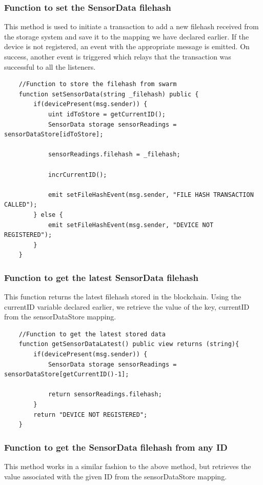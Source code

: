 \documentclass[11pt,openright]{report}
\begin{document}
\subsubsection{Function to set the SensorData filehash}
This method is used to initiate a transaction to add a new filehash received from the storage system and save it to the mapping we have declared earlier. If the device is not registered, an event with the appropriate message is emitted. On success, another event is triggered which relays that the transaction was successful to all the listeners.

\begin{verbatim}
    //Function to store the filehash from swarm
    function setSensorData(string _filehash) public {
        if(devicePresent(msg.sender)) {
            uint idToStore = getCurrentID();
            SensorData storage sensorReadings = sensorDataStore[idToStore];

            sensorReadings.filehash = _filehash;
       
            incrCurrentID();
            
            emit setFileHashEvent(msg.sender, "FILE HASH TRANSACTION CALLED");
        } else {
            emit setFileHashEvent(msg.sender, "DEVICE NOT REGISTERED");
        }
    }
\end{verbatim}

\subsubsection{Function to get the latest SensorData filehash}
This function returns the latest filehash stored in the blockchain. Using the currentID variable declared earlier, we retrieve the value of the key, currentID from the sensorDataStore mapping.

\begin{verbatim}
    //Function to get the latest stored data
    function getSensorDataLatest() public view returns (string){
        if(devicePresent(msg.sender)) {
            SensorData storage sensorReadings = sensorDataStore[getCurrentID()-1];

            return sensorReadings.filehash;
        }
        return "DEVICE NOT REGISTERED";
    }
\end{verbatim}

\subsubsection{Function to get the SensorData filehash from any ID}
This method works in a similar fashion to the above method, but retrieves the value associated with the given ID from the sensorDataStore mapping.
\end{document}
